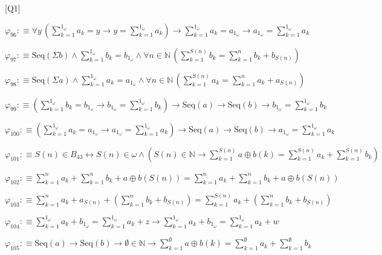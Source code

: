 \begin{fullproof}{[Q1]}
\begin{abbrevlist}
\item $\varphi_{96} :\equiv \forall y\,({\textstyle\sum_{k=1}^{1_{\omega}} a_{k}} = y \to y = {\textstyle\sum_{k=1}^{1_{\omega}} a_{k}}) \to {\textstyle\sum_{k=1}^{1_{\omega}} a_{k}} = a_{1_{\omega}} \to a_{1_{\omega}} = {\textstyle\sum_{k=1}^{1_{\omega}} a_{k}}$
\item $\varphi_{97} :\equiv \mathrm{Seq}(\Sigma b) \land {\textstyle\sum_{k=1}^{1_{\omega}} b_{k}} = b_{1_{\omega}} \land \forall n \in \mathbb{N}\,({\textstyle\sum_{k=1}^{S(n)} b_{k}} = {\textstyle\sum_{k=1}^{n} b_{k}} + b_{S(n)})$
\item $\varphi_{98} :\equiv \mathrm{Seq}(\Sigma a) \land {\textstyle\sum_{k=1}^{1_{\omega}} a_{k}} = a_{1_{\omega}} \land \forall n \in \mathbb{N}\,({\textstyle\sum_{k=1}^{S(n)} a_{k}} = {\textstyle\sum_{k=1}^{n} a_{k}} + a_{S(n)})$
\item $\varphi_{99} :\equiv ({\textstyle\sum_{k=1}^{1_{\omega}} b_{k}} = b_{1_{\omega}} \to b_{1_{\omega}} = {\textstyle\sum_{k=1}^{1_{\omega}} b_{k}}) \to \mathrm{Seq}(a) \to \mathrm{Seq}(b) \to b_{1_{\omega}} = {\textstyle\sum_{k=1}^{1_{\omega}} b_{k}}$
\item $\varphi_{100} :\equiv ({\textstyle\sum_{k=1}^{1_{\omega}} a_{k}} = a_{1_{\omega}} \to a_{1_{\omega}} = {\textstyle\sum_{k=1}^{1_{\omega}} a_{k}}) \to \mathrm{Seq}(a) \to \mathrm{Seq}(b) \to a_{1_{\omega}} = {\textstyle\sum_{k=1}^{1_{\omega}} a_{k}}$
\item $\varphi_{101} :\equiv S(n) \in B_{43} \leftrightarrow S(n) \in \omega \land (S(n) \in \mathbb{N} \to {\textstyle\sum_{k=1}^{S(n)} a \oplus b(k)} = {\textstyle\sum_{k=1}^{S(n)} a_{k}} + {\textstyle\sum_{k=1}^{S(n)} b_{k}})$
\item $\varphi_{102} :\equiv {\textstyle\sum_{k=1}^{n} a_{k}} + {\textstyle\sum_{k=1}^{n} b_{k}} + a \oplus b(S(n)) = {\textstyle\sum_{k=1}^{n} a_{k}} + {\textstyle\sum_{k=1}^{n} b_{k}} + a \oplus b(S(n))$
\item $\varphi_{103} :\equiv {\textstyle\sum_{k=1}^{n} a_{k}} + a_{S(n)} + ({\textstyle\sum_{k=1}^{n} b_{k}} + b_{S(n)}) = {\textstyle\sum_{k=1}^{S(n)} a_{k}} + ({\textstyle\sum_{k=1}^{n} b_{k}} + b_{S(n)})$
\item $\varphi_{104} :\equiv {\textstyle\sum_{k=1}^{1_{\omega}} a_{k}} + b_{1_{\omega}} = {\textstyle\sum_{k=1}^{1_{\omega}} a_{k}} + z \to {\textstyle\sum_{k=1}^{1_{\omega}} a_{k}} + b_{1_{\omega}} = {\textstyle\sum_{k=1}^{1_{\omega}} a_{k}} + w$
\item $\varphi_{105} :\equiv \mathrm{Seq}(a) \to \mathrm{Seq}(b) \to \emptyset \in \mathbb{N} \to {\textstyle\sum_{k=1}^{\emptyset} a \oplus b(k)} = {\textstyle\sum_{k=1}^{\emptyset} a_{k}} + {\textstyle\sum_{k=1}^{\emptyset} b_{k}}$

\end{abbrevlist}
\end{fullproof}
